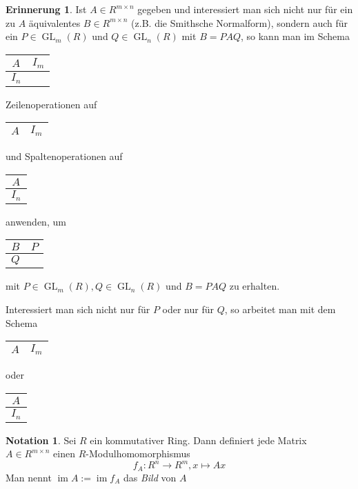 \documentclass[
twoside=semi,
fontsize=12,
DIV=12, 
cleardoublepage=current,
leqno,
headings=optiontoheadandtoc, 
toc=idx
]{scrbook}
\DeclareMathOperator{\im}{im}
\DeclareMathOperator{\GL}{GL}
\theoremstyle{definition}
\newtheorem{notation}[definition]{Notation}
\newtheorem{erinnerung}[definition]{Erinnerung}
\begin{document}
\begin{erinnerung}
	Ist $A \in R^{m\times n}$ gegeben und interessiert man sich nicht nur f\"ur ein zu $A$ \"aquivalentes $B \in R^{m\times n}$ (z.B. die Smithsche Normalform), sondern auch f\"ur ein $P \in \GL_m(R)$ und $Q \in \GL_n(R)$ mit $B = PAQ$, so kann man im Schema \begin{tabular}{|c|c}\hline
		$A$ & $I_m$\vline \\\hline $I_n$ &\\\cline{1-1}
	\end{tabular} Zeilenoperationen auf \begin{tabular}{|c|c|}\hline
		$A$ & $I_m$\\\hline
	\end{tabular} und Spaltenoperationen auf \begin{tabular}{|c|}\hline
	$A$ \\\hline $I_n$\\\hline
	\end{tabular} anwenden, um \begin{tabular}{|c|c}\hline
	$B$ & $P$\vline \\\hline $Q$ &\\\cline{1-1}
	\end{tabular} mit $P \in \GL_m(R), Q \in \GL_n(R)$ und $B=PAQ$ zu erhalten.
	
	Interessiert man sich nicht nur f\"ur $P$ oder nur f\"ur $Q$, so arbeitet man mit dem Schema \begin{tabular}{|c|c|}\hline
		$A$ & $I_m$\\\hline
	\end{tabular} oder \begin{tabular}{|c|}\hline
	$A$ \\\hline $I_n$\\\hline
	\end{tabular}

 	\end{erinnerung}
 
	\begin{notation}\label{1.6.5}
		Sei $R$ ein kommutativer Ring. Dann definiert jede Matrix $A \in R^{m \times n}$ einen $R$-Modulhomomorphismus
			\[f_A:R^n \to R^m, x \mapsto Ax\]
		Man nennt $\im A := \im f_A$ das \emph{Bild} von $A$
	\end{notation}
\end{document}
